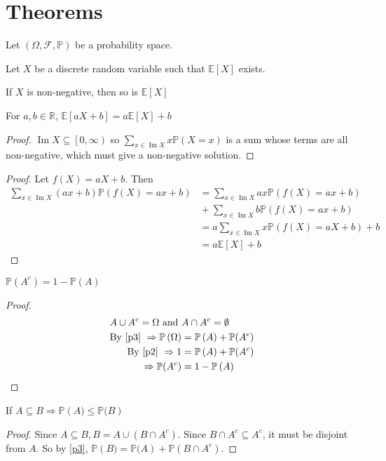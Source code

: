 \documentclass[fontsize=10pt]{article}
\numberwithin{equation}{subsection}
\newcommand{\PP}[1]{\mathbb{P}\left(#1\right)}
\newcommand{\EE}[1]{\mathbb{E}\left[#1\right]}
\newcommand{\image}{\mathop{\mathrm{Im}}}
\newcommand{\setreal}{\mathbb{R}}
\newcommand{\FF}{\mathcal{F}}
\begin{document}
\section{Theorems}
Let $(\Omega,\FF,\mathbb{P})$ be a probability space.
\begin{itemize*}
\item Let $X$ be a discrete random variable such that $\EE{X}$ exists.  
\begin{itemize*}
\item If $X$ is non-negative, then so is $\EE{X}$
\item For $a,b\in\setreal$, $\EE{aX+b}=a\EE{X}+b$
\end{itemize*}
\begin{itemize*}
\item\begin{proof}
$\image X\subseteq\left[0,\infty\right)$ so $\sum_{x\in\image X}x\PP{X=x}$ is a sum whose terms are all non-negative, which must give a non-negative solution.
\end{proof}
\item\begin{proof}
Let $f(X)=aX+b$.  Then \begin{align*}
\sum_{x\in\image X}(ax+b)\PP{f(X)=ax+b}&=\sum_{x\in\image X}ax\PP{f(X)=ax+b}\\
&{}+\sum_{x\in\image X}b\PP{f(X)=ax+b}\\
&=a\sum_{x\in\image X}x\PP{f(X)=aX+b}+b\\
&=a\EE{X}+b
\end{align*}
\end{proof}
\end{itemize*}
\begin{multicols}{2}
\item $\mathbb{P}(A^c)=1-\PP{A}$
\begin{proof}
\begin{align*}
A\cup A^c=\Omega\text{ and }&A \cap A^c = \emptyset\\
\text{By \eqref{p3} }\Rightarrow\PP{\Omega} &= \PP{A}+\mathbb{P}(A^c)\\
\text{By \eqref{p2} }\Rightarrow1&=\PP{A}+\mathbb{P}(A^c)\\
\Rightarrow\mathbb{P}(A^c)&=1-\PP{A}
\end{align*}
\end{proof}
\item If $A\subseteq B\Rightarrow \PP{A)\le\mathbb{P}(B}$
\begin{proof}
Since $A\subseteq B, B=A\cup\left(B\cap A^c\right)\text{. Since }B\cap A^c\subseteq A^c$, it must be disjoint from $A$.  So by \eqref{p3}, $\PP{B)=\mathbb{P}(A}+\mathbb{P}(B\cap A^c)$.

\end{proof}
\end{multicols}
\end{itemize*}
\end{document}
